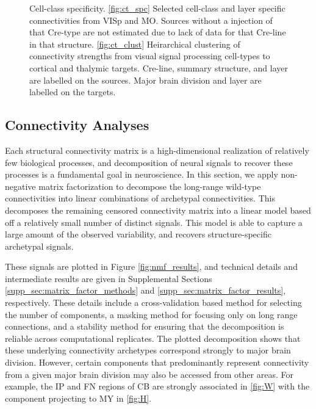 \newpage

\begin{figure}[H]
    \newline
    
    \caption{  Cell-class specificity. \ref{fig:ct_spc} Selected cell-class and layer specific connectivities from VISp and MO.
	 Sources without a injection of that Cre-type are not estimated due to lack of data for that Cre-line in that structure.
    		\ref{fig:ct_clust}
		Heirarchical clustering of connectivity strengths from visual signal processing cell-types to cortical and thalymic targets.
		Cre-line, summary structure, and layer are labelled on the sources.
		Major brain division and layer are labelled on the targets.}
\label{fig:data_ct}
\end{figure}

\newpage

\subsection{Connectivity Analyses}

Each structural connectivity matrix is a high-dimensional realization of relatively few biological processes, and decomposition of neural signals to recover these processes is a fundamental goal in neuroscience.
In this section, we apply non-negative matrix factorization to decompose the long-range wild-type connectivities into linear combinations of archetypal connectivities.
This decomposes the remaining censored connectivity matrix into a linear model based off a relatively small number of distinct signals.
This model is able to capture a large amount of the observed variability, and recovers structure-specific archetypal signals.

These signals are plotted in Figure \ref{fig:nmf_results}, and technical details and intermediate results are given in Supplemental Sections \ref{supp_sec:matrix_factor_methods} and \ref{supp_sec:matrix_factor_results}, respectively.
These details include a cross-validation based method for selecting the number of components, a masking method for focusing only on long range connections, and a stability method for ensuring that the decomposition is reliable across computational replicates.
The plotted decomposition shows that these underlying connectivity archetypes correspond strongly to major brain division.
However, certain components that predominantly represent connectivity from a given major brain division may also be accessed from other areas.
For example, the IP and FN regions of CB are strongly associated in \ref{fig:W} with the component projecting to MY in \ref{fig:H}.

